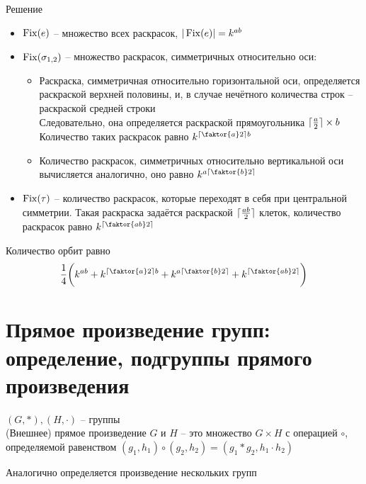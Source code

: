 \begin{exmpls}
\begin{undefthm}{Решение}
		\begin{itemize}
			\item $ \Fix(e) $ -- множество всех раскрасок, $ |\Fix(e)| = k^{ab} $
			\item $ \Fix(\sigma_{1, 2}) $ -- множество раскрасок, симметричных относительно оси:
			\begin{itemize}
				\item Раскраска, симметричная относительно горизонтальной оси, определяется раскраской верхней половины, и, в случае нечётного количества строк -- раскраской средней строки \\
				Следовательно, она определяется раскраской прямоугольника $ \lceil \half[a] \rceil \times b $ \\
				Количество таких раскрасок равно $ k^{\lceil \faktor{a}2 \rceil b} $
				\item Количество раскрасок, симметричных относительно вертикальной оси вычисляется аналогично, оно равно $ k^{a \lceil \faktor{b}2 \rceil} $
			\end{itemize}
			\item $ \Fix(\tau) $ -- количество раскрасок, которые переходят в себя при центральной симметрии. Такая раскраска задаётся раскраской $ \lceil \half[ab] \rceil $ клеток, количество раскрасок равно $ k^{\lceil \faktor{ab}2 \rceil} $
		\end{itemize}
		Количество орбит равно
		$$ \frac14 \bigg( k^{ab} + k^{\lceil \faktor{a}2 \rceil b} + k^{a \lceil \faktor{b}2 \rceil} + k^{\lceil \faktor{ab}2 \rceil} \bigg) $$
	\end{undefthm}
\end{exmpls}

\section{Прямое произведение групп: определение, подгруппы прямого произведения}

\begin{definition}
	$ (G, *), (H, \cdot) $ -- группы \\
	(Внешнее) прямое произведение $ G $ и $ H $ -- это множество $ G \times H $ с операцией $ \circ $, определяемой равенством $ (g_1, h_1) \circ (g_2, h_2) = (g_1 * g_2, h_1 \cdot h_2) $
\end{definition}

\begin{note}
	Аналогично определяется произведение нескольких групп
\end{note}

